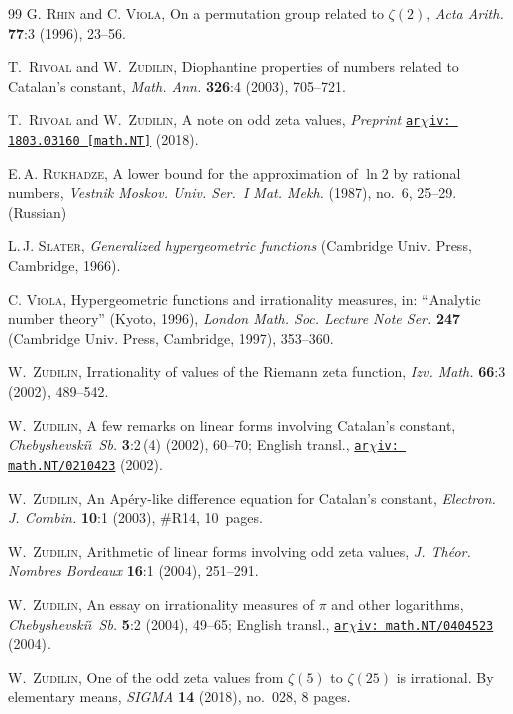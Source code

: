 \documentclass[12pt,reqno]{amsart}
\begin{document}
\begin{thebibliography}{99}
\textsc{G. Rhin} and \textsc{C. Viola},
On a permutation group related to $\zeta(2)$,
\emph{Acta Arith.} \textbf{77}:3 (1996), 23--56.

\textsc{T.~Rivoal} and \textsc{W.~Zudilin},
Diophantine properties of numbers related to Catalan's constant,
\emph{Math. Ann.} \textbf{326}:4 (2003), 705--721.

\textsc{T.~Rivoal} and \textsc{W.~Zudilin},
A note on odd zeta values,
\emph{Preprint} \href{http://arxiv.org/abs/1803.03160}{\texttt{ar$\chi$iv:\,1803.03160 [math.NT]}} (2018).

\textsc{E.\,A. Rukhadze},
A lower bound for the approximation of $\ln2$ by rational numbers,
\emph{Vestnik Moskov. Univ. Ser.~I Mat. Mekh.} (1987), no.~6, 25--29. (Russian)

\textsc{L.\,J. Slater},
\emph{Generalized hypergeometric functions}
(Cambridge Univ. Press, Cambridge, 1966).

\textsc{C. Viola},
Hypergeometric functions and irrationality measures,
in: ``Analytic number theory'' (Kyoto, 1996), \emph{London Math. Soc. Lecture Note Ser.} \textbf{247} (Cambridge Univ. Press, Cambridge, 1997), 353--360.

\textsc{W.~Zudilin},
Irrationality of values of the Riemann zeta function,
\emph{Izv. Math.} \textbf{66}:3 (2002), 489--542.

\textsc{W.~Zudilin},
A few remarks on linear forms involving Catalan's constant,
\emph{Chebyshevski\v\i\ Sb.} \textbf{3}:2\,(4) (2002), 60--70;
English transl., \href{http://arxiv.org/math.NT/0210423}{\texttt{ar$\chi$iv:\,math.NT/0210423}} (2002).

\textsc{W.~Zudilin},
An Ap\'ery-like difference equation for Catalan's constant,
\emph{Electron. J. Combin.} \textbf{10}:1 (2003), \#R14, 10~pages.

\textsc{W.~Zudilin},
Arithmetic of linear forms involving odd zeta values,
\emph{J. Th\'eor. Nombres Bordeaux} \textbf{16}:1 (2004), 251--291.

\textsc{W.~Zudilin},
An essay on irrationality measures of $\pi$ and other logarithms,
\emph{Chebyshevski\v\i\ Sb.} \textbf{5}:2 (2004), 49--65;
English transl., \href{http://arxiv.org/math.NT/0404523}{\texttt{ar$\chi$iv:\,math.NT/0404523}} (2004).

\textsc{W.~Zudilin},
One of the odd zeta values from $\zeta(5)$ to $\zeta(25)$ is irrational. By elementary means,
\emph{SIGMA} \textbf{14} (2018),  no.~028, 8 pages.

\end{thebibliography}
\end{document}

